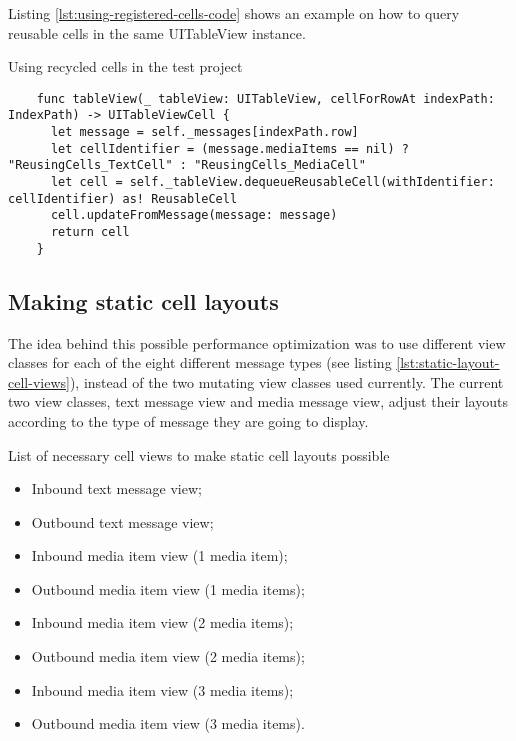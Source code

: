 \documentclass[a4paper,12pt]{article}
\begin{document}
Listing \autoref{lst:using-registered-cells-code} shows an example on how to query reusable cells in the same UITableView instance.
\begin{listing}[H]
  \caption{Using recycled cells in the test project}
  \label{lst:using-registered-cells-code}
  \begin{verbatim}
    func tableView(_ tableView: UITableView, cellForRowAt indexPath: IndexPath) -> UITableViewCell {
      let message = self._messages[indexPath.row]
      let cellIdentifier = (message.mediaItems == nil) ? "ReusingCells_TextCell" : "ReusingCells_MediaCell"
      let cell = self._tableView.dequeueReusableCell(withIdentifier: cellIdentifier) as! ReusableCell
      cell.updateFromMessage(message: message)
      return cell
    }
  \end{verbatim}
\end{listing}

\subsection{Making static cell layouts}
\label{subsec:making-static-cell-layouts}
The idea behind this possible performance optimization was to use different view classes for each of the eight different message types (see listing \autoref{lst:static-layout-cell-views}), instead of the two mutating view classes used currently. The current two view classes, text message view and media message view, adjust their layouts according to the type of message they are going to display.

\begin{listing}[H]
  \caption{List of necessary cell views to make static cell layouts possible}
  \label{lst:static-layout-cell-views}
  \begin{itemize}
    \item Inbound text message view;
    \item Outbound text message view;
    \item Inbound media item view (1 media item);
    \item Outbound media item view (1 media items);
    \item Inbound media item view (2 media items);
    \item Outbound media item view (2 media items);
    \item Inbound media item view (3 media items);
    \item Outbound media item view (3 media items).
  \end{itemize}
\end{listing}
\end{document}

